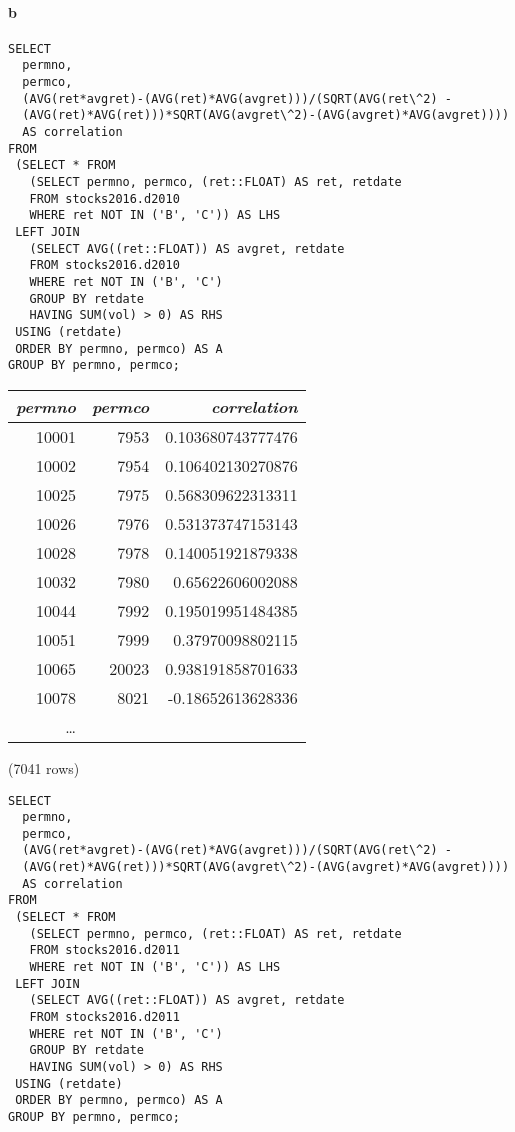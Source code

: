 \documentclass[]{article}
\let\oldparagraph\paragraph
\renewcommand{\paragraph}[1]{\oldparagraph{#1}\mbox{}}
\begin{document}
\paragraph{b}

\color{blue}
\begin{verbatim}
SELECT
  permno,
  permco,
  (AVG(ret*avgret)-(AVG(ret)*AVG(avgret)))/(SQRT(AVG(ret\^2) -
  (AVG(ret)*AVG(ret)))*SQRT(AVG(avgret\^2)-(AVG(avgret)*AVG(avgret))))
  AS correlation
FROM
 (SELECT * FROM
   (SELECT permno, permco, (ret::FLOAT) AS ret, retdate
   FROM stocks2016.d2010
   WHERE ret NOT IN ('B', 'C')) AS LHS
 LEFT JOIN
   (SELECT AVG((ret::FLOAT)) AS avgret, retdate
   FROM stocks2016.d2010
   WHERE ret NOT IN ('B', 'C')
   GROUP BY retdate
   HAVING SUM(vol) > 0) AS RHS
 USING (retdate)
 ORDER BY permno, permco) AS A
GROUP BY permno, permco;
\end{verbatim}
\color{black}

\begin{center}
\begin{tabular}{r | r | r}
\textit{permno} & \textit{permco} & \textit{correlation} \\
\hline
10001 & 7953 & 0.103680743777476 \\
10002 & 7954 & 0.106402130270876 \\
10025 & 7975 & 0.568309622313311 \\
10026 & 7976 & 0.531373747153143 \\
10028 & 7978 & 0.140051921879338 \\
10032 & 7980 & 0.65622606002088 \\
10044 & 7992 & 0.195019951484385 \\
10051 & 7999 & 0.37970098802115 \\
10065 & 20023 & 0.938191858701633 \\
10078 & 8021 & -0.18652613628336 \\
\ldots\\
\end{tabular}

\noindent (7041 rows) \\
\end{center}

\color{blue}
\begin{verbatim}
SELECT
  permno,
  permco,
  (AVG(ret*avgret)-(AVG(ret)*AVG(avgret)))/(SQRT(AVG(ret\^2) -
  (AVG(ret)*AVG(ret)))*SQRT(AVG(avgret\^2)-(AVG(avgret)*AVG(avgret))))
  AS correlation
FROM
 (SELECT * FROM
   (SELECT permno, permco, (ret::FLOAT) AS ret, retdate
   FROM stocks2016.d2011
   WHERE ret NOT IN ('B', 'C')) AS LHS
 LEFT JOIN
   (SELECT AVG((ret::FLOAT)) AS avgret, retdate
   FROM stocks2016.d2011
   WHERE ret NOT IN ('B', 'C')
   GROUP BY retdate
   HAVING SUM(vol) > 0) AS RHS
 USING (retdate)
 ORDER BY permno, permco) AS A
GROUP BY permno, permco;
\end{verbatim}
\color{black}
\end{document}
